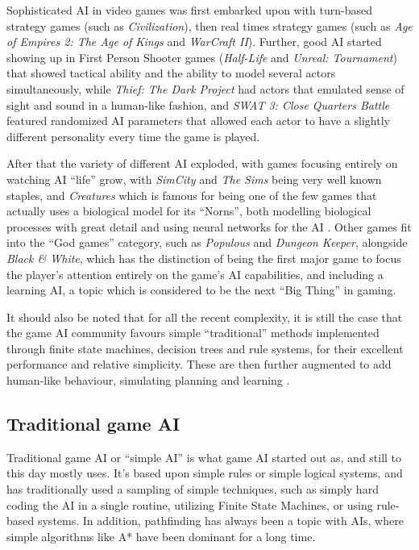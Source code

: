 \documentclass[]{report}
\begin{document}
Sophisticated AI in video games was first embarked upon with turn-based strategy
games (such as \emph{Civilization}), then real times strategy games (such as
\emph{Age of Empires 2: The Age of Kings} and \emph{WarCraft II}). Further, good
AI started showing up in First Person Shooter games (\emph{Half-Life} and
\emph{Unreal: Tournament}) that showed tactical ability and the ability to model
several actors simultaneously, while \emph{Thief: The Dark Project} had actors
that emulated sense of sight and sound in a human-like fashion, and \emph{SWAT
  3: Close Quarters Battle} featured randomized AI parameters that allowed each
actor to have a slightly different personality every time the game is played.

After that the variety of different AI exploded, with games focusing entirely on
watching AI ``life'' grow, with \emph{SimCity} and \emph{The Sims} being very
well known staples, and \emph{Creatures} which is famous for being one of the
few games that actually uses a biological model for its ``Norns'', both
modelling biological processes with great detail and using neural networks for
the AI \citep[see][]{grand1997creatures}. Other games fit into the ``God games''
category, such as \emph{Populous} and \emph{Dungeon Keeper}, alongside
\emph{Black \& White}, which has the distinction of being the first major game
to focus the player's attention entirely on the game's AI capabilities, and
including a learning AI, a topic which is considered to be the next ``Big
Thing'' in gaming.

It should also be noted that for all the recent complexity, it is still the case
that the game AI community favours simple ``traditional'' methods implemented
through finite state machines, decision trees and rule systems, for their
excellent performance and relative simplicity. These are then further augmented
to add human-like behaviour, simulating planning and learning
\citep[see][]{orkin2003applying,isla2002new,khoo2002efficient,mateas2002behavior}.

\subsection{Traditional game AI}
\label{sec:traditional-game-ai}

Traditional game AI or ``simple AI'' is what game AI started out as, and still
to this day mostly uses. It's based upon simple rules or simple logical systems,
and has traditionally used a sampling of simple techniques, such as simply hard
coding the AI in a single routine, utilizing Finite State Machines, or using
rule-based systems. In addition, pathfinding has always been a topic with AIs,
where simple algorithms like A* have been dominant for a long time.
\end{document}
